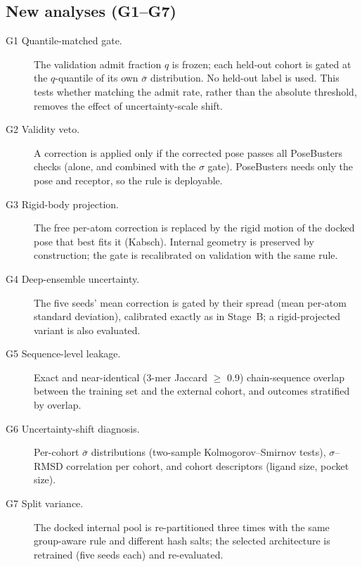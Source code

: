 \subsection{New analyses (G1--G7)}\label{sec:gaps}
\begin{description}
\item[G1 Quantile-matched gate.] The validation admit fraction $q$ is frozen; each held-out cohort is gated at the
      $q$-quantile of its own $\bar\sigma$ distribution. No held-out label is used. This tests whether matching the admit
      rate, rather than the absolute threshold, removes the effect of uncertainty-scale shift.
\item[G2 Validity veto.] A correction is applied only if the corrected pose passes all PoseBusters checks (alone, and
      combined with the $\sigma$ gate). PoseBusters needs only the pose and receptor, so the rule is deployable.
\item[G3 Rigid-body projection.] The free per-atom correction is replaced by the rigid motion of the docked pose that
      best fits it (Kabsch). Internal geometry is preserved by construction; the gate is recalibrated on validation with
      the same rule.
\item[G4 Deep-ensemble uncertainty.] The five seeds' mean correction is gated by their spread (mean per-atom standard
      deviation), calibrated exactly as in Stage~B; a rigid-projected variant is also evaluated.
\item[G5 Sequence-level leakage.] Exact and near-identical (3-mer Jaccard $\ge$ 0.9) chain-sequence overlap between the
      training set and the external cohort, and outcomes stratified by overlap.
\item[G6 Uncertainty-shift diagnosis.] Per-cohort $\bar\sigma$ distributions (two-sample Kolmogorov--Smirnov tests),
      $\sigma$--RMSD correlation per cohort, and cohort descriptors (ligand size, pocket size).
\item[G7 Split variance.] The docked internal pool is re-partitioned three times with the same group-aware rule and
      different hash salts; the selected architecture is retrained (five seeds each) and re-evaluated.
\end{description}

